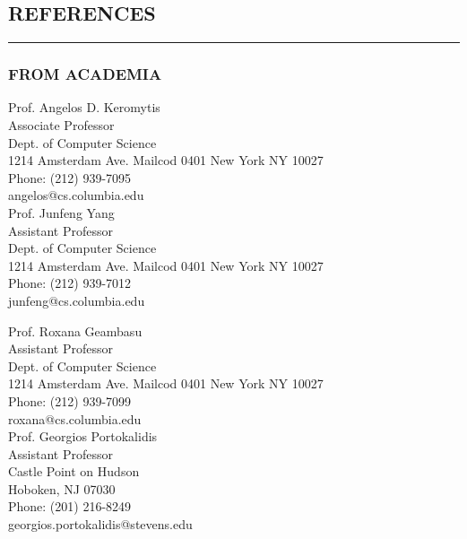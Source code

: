 \documentclass[10pt,a4]{article}
\begin{document}
\begin{small}
\subsection*{REFERENCES}
\hrule
\vspace{0.2cm}


\subsubsection*{FROM ACADEMIA}
\begin{footnotesize}

\begin{multicols}{2} 
\noindent 
Prof. Angelos D. Keromytis \\
Associate Professor \\
Dept. of Computer Science \\
1214 Amsterdam Ave. Mailcod 0401
New York NY 10027 \\
Phone: (212) 939-7095 \\
angelos@cs.columbia.edu \\

\noindent
Prof. Junfeng Yang\\
Assistant Professor \\
Dept. of Computer Science \\
1214 Amsterdam Ave. Mailcod 0401
New York NY 10027 \\
Phone: (212) 939-7012 \\
junfeng@cs.columbia.edu \\
\columnbreak

\noindent
Prof. Roxana Geambasu\\
Assistant Professor \\
Dept. of Computer Science \\
1214 Amsterdam Ave. Mailcod 0401
New York NY 10027 \\
Phone: (212) 939-7099 \\
roxana@cs.columbia.edu \\

\noindent
Prof. Georgios Portokalidis \\
Assistant Professor \\
Castle Point on Hudson \\
Hoboken, NJ 07030 \\
Phone: (201) 216-8249 \\
 georgios.portokalidis@stevens.edu \\
\end{multicols}


\end{footnotesize}
\end{small}
\end{document}
